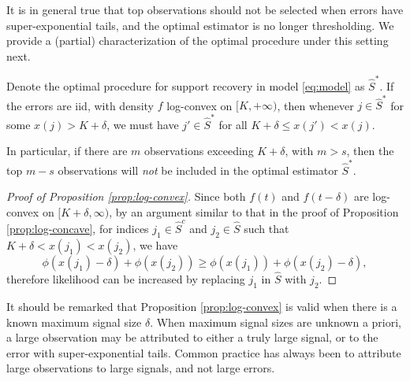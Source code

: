 It is in general true that top observations should not be selected when errors have super-exponential tails, and the optimal estimator is no longer thresholding.
We provide a (partial) characterization of the optimal procedure under this setting next.

\begin{proposition} \label{prop:log-convex}
Denote the optimal procedure for support recovery in model \eqref{eq:model} as $\widehat{S}^*$.
If the errors are iid, with density $f$ log-convex on $[K, +\infty)$, then whenever $j\in\widehat{S}^*$ for some $x(j) > K+\delta$, we must have $j'\in\widehat{S}^*$ for all $K+\delta \le x(j') < x(j)$.

In particular, if there are $m$ observations exceeding $K+\delta$, with $m>s$, then the top $m-s$ observations will \emph{not} be included in the optimal estimator $\widehat{S}^*$.
\end{proposition} 

\begin{proof}[Proof of Proposition \ref{prop:log-convex}]
Since both $f(t)$ and $f(t-\delta)$ are log-convex on $[K+\delta, \infty)$, 
by an argument similar to that in the proof of Proposition \ref{prop:log-concave}, for indices $j_1 \in \widehat{S}^c$ and $j_2 \in \widehat{S}$ such that $K+\delta < x(j_1) < x(j_2)$, we have
$$
\phi(x(j_1) - \delta) + \phi(x(j_2)) \ge \phi(x(j_1)) + \phi(x(j_2) - \delta),
$$
therefore likelihood can be increased by replacing $j_1$ in $\widehat{S}$ with $j_2$.
\end{proof}

It should be remarked that Proposition \ref{prop:log-convex} is valid when there is a known maximum signal size $\delta$. 
When maximum signal sizes are unknown a priori, a large observation may be attributed to either a truly large signal, or to the error with super-exponential tails.
Common practice has always been to attribute large observations to large signals, and not large errors.

